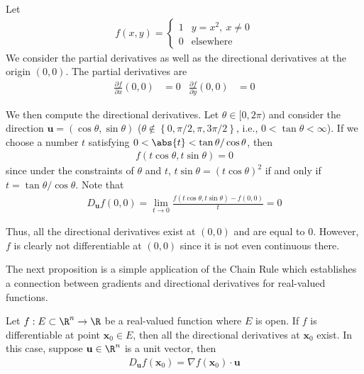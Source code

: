 \documentclass[thmcnt=section, 12pt]{elegantbook}
\begin{document}
\begin{example}
    Let
    \begin{align*}
        f(x, y) = \begin{cases}
            1 &y = x^2, \ x \neq 0 \\ 
            0 &\text{elsewhere}
        \end{cases}
    \end{align*}
    We consider the partial derivatives as well as the directional derivatives at the origin $(0,0)$. The partial derivatives are 
    \begin{align*}
        \frac{\partial f}{\partial x}(0,0)
        &= 0 & 
        \frac{\partial f}{\partial y}(0,0)
        &= 0
    \end{align*}
    
    \par We then compute the directional derivatives. Let $\theta \in [0,2\pi)$ and consider the direction $\mathbf{u} = (\cos \theta, \sin \theta)$ ($\theta \notin \left\{0, \pi/2, \pi, 3\pi/2\right\}$, i.e., $0 < \tan \theta < \infty$). If we choose a number $t$ satisfying $0 < \abs{t} < \tan \theta / \cos\theta$, then 
    \begin{align*}
        f(t\cos \theta, t\sin \theta) = 0
    \end{align*}
    since under the constraints of $\theta$ and $t$, $t\sin \theta = (t\cos \theta)^2$ if and only if $t = \tan\theta / \cos\theta$. Note that 
    \begin{align*}
        D_{\mathbf{u}}f (0,0)
        = \lim_{t \to 0} \frac{f(t\cos\theta, t\sin\theta) - f(0,0)}{t}
        = 0
    \end{align*}

    \par Thus, all the directional derivatives exist at $(0,0)$ and are equal to $0$. However, $f$ is clearly not differentiable at $(0,0)$ since it is not even continuous there.
\end{example}


\par The next proposition is a simple application of the Chain Rule which establishes a connection between gradients and directional derivatives for real-valued functions. 

\begin{proposition}
    Let $f: E \subset \R^n \to \R$ be a real-valued function where $E$ is open.
    If $f$ is differentiable at point $\mathbf{x}_0 \in E$, then all the directional derivatives at $\mathbf{x}_0$ exist. In this case, suppose $\mathbf{u} \in \R^n$ is a unit vector, then 
    \begin{align}
        D_{\mathbf{u}}f (\mathbf{x}_0)
        = \nabla f (\mathbf{x}_0) \cdot \mathbf{u}
        \label{eq:47}
    \end{align}
\end{proposition}
\end{document}
